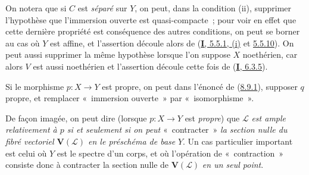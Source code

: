 On notera que si $C$ est \emph{séparé} sur $Y$, on peut, dans la condition
(ii), supprimer l'hypothèse que l'immersion ouverte est quasi-compacte~; pour
voir en effet que cette dernière propriété est conséquence des autres
conditions, on peut se borner au cas où $Y$ est affine, et l'assertion découle
alors de (\hyperref[I.5.5.1-fr]{\textbf{I}, 5.5.1, (i)} et
\hyperref[I.5.5.10-fr]{5.5.10}). On peut aussi supprimer
la même hypothèse lorsque l'on suppose $X$ noethérien, car alors $V$ est aussi
noethérien et l'assertion découle cette fois de
(\hyperref[I.6.3.5-fr]{\textbf{I}, 6.3.5}).

\begin{corollary}[8.9.2]
\label{II.8.9.2-fr}
Si le morphisme $p:X\to Y$ est propre, on peut dans l'énoncé de
\textup{(\hyperref[II.8.9.1-fr]{8.9.1})}, supposer $q$ propre, et remplacer
«~immersion ouverte~» par «~isomorphisme~».
\end{corollary}

De façon imagée, on peut dire (lorsque $p:X\to Y$ est \emph{propre}) que
$\mathcal{L}$ \emph{est ample relativement à $p$ si et seulement si on peut}
«~contracter~» \emph{la section nulle du fibré vectoriel $\mathbf{V}(\mathcal{L})$
en le préschéma de base} $Y$. Un cas particulier important est celui où $Y$
est le spectre d'un corps, et où l'opération de «~contraction~» consiste donc
à contracter la section nulle de $\mathbf{V}(\mathcal{L})$ \emph{en un seul
point}.

